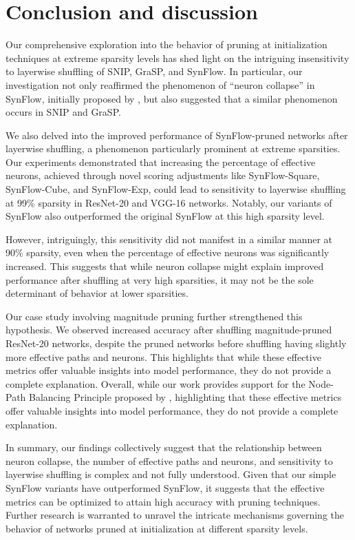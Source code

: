 \chapter{Conclusion and discussion}
\label{ch:concl}

Our comprehensive exploration into the behavior of pruning at initialization techniques at extreme sparsity levels has shed light on the intriguing insensitivity to layerwise shuffling of SNIP, GraSP, and SynFlow. In particular, our investigation not only reaffirmed the phenomenon of ``neuron collapse'' in SynFlow, initially proposed by \textcite{frankle21}, but also suggested that a similar phenomenon occurs in SNIP and GraSP.

We also delved into the improved performance of SynFlow-pruned networks after layerwise shuffling, a phenomenon particularly prominent at extreme sparsities. Our experiments demonstrated that increasing the percentage of effective neurons, achieved through novel scoring adjustments like SynFlow-Square, SynFlow-Cube, and SynFlow-Exp, could lead to sensitivity to layerwise shuffling at 99\% sparsity in ResNet-20 and VGG-16 networks. Notably, our variants of SynFlow also outperformed the original SynFlow at this high sparsity level.

However, intriguingly, this sensitivity did not manifest in a similar manner at 90\% sparsity, even when the percentage of effective neurons was significantly increased. This suggests that while neuron collapse might explain improved performance after shuffling at very high sparsities, it may not be the sole determinant of behavior at lower sparsities.

Our case study involving magnitude pruning further strengthened this hypothesis. We observed increased accuracy after shuffling magnitude-pruned ResNet-20 networks, despite the pruned networks before shuffling having slightly more effective paths and neurons. This highlights that while these effective metrics offer valuable insights into model performance, they do not provide a complete explanation. Overall, while our work provides support for the Node-Path Balancing Principle proposed by \textcite{pham23}, highlighting that these effective metrics offer valuable insights into model performance, they do not provide a complete explanation.

In summary, our findings collectively suggest that the relationship between neuron collapse, the number of effective paths and neurons, and sensitivity to layerwise shuffling is complex and not fully understood. Given that our simple SynFlow variants have outperformed SynFlow, it suggests that the effective metrics can be optimized to attain high accuracy with pruning techniques. Further research is warranted to unravel the intricate mechanisms governing the behavior of networks pruned at initialization at different sparsity levels.



